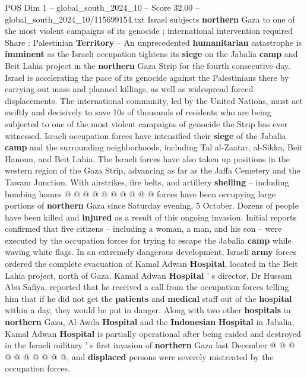 \begin{textsample}{POS Dim 1 – global\_south\_2024\_10 – Score 32.00 – global\_south\_2024\_10/115699154.txt}  \label{ex:f1_pos_165}
Israel subjects \textbf{northern} Gaza to one of the most violent campaigns of its genocide ; international intervention required Share : Palestinian \textbf{Territory} -- An unprecedented \textbf{humanitarian} catastrophe is \textbf{imminent} as the Israeli occupation tightens its \textbf{siege} on the Jabalia \textbf{camp} and Beit Lahia project in the \textbf{northern} Gaza Strip for the fourth consecutive day.
Israel is accelerating the pace of its genocide against the Palestinians there by carrying out mass and planned killings, as well as widespread forced displacements.
The international community, led by the United Nations, must act swiftly and decisively to save 10s of thousands of residents who are being subjected to one of the most violent campaigns of genocide the Strip has ever witnessed.
Israeli occupation forces have intensified their \textbf{siege} of the Jabalia \textbf{camp} and the surrounding neighborhoods, including Tal al-Zaatar, al-Sikka, Beit Hanoun, and Beit Lahia.
The Israeli forces have also taken up positions in the western region of the Gaza Strip, advancing as far as the Jaffa Cemetery and the Tawam Junction.
With airstrikes, fire belts, and artillery \textbf{shelling} -- including bombing homes @ @ @ @ @ @ @ @ @ @ forces have been occupying large portions of \textbf{northern} Gaza since Saturday evening, 5 October.
Dozens of people have been killed and \textbf{injured} as a result of this ongoing invasion.
Initial reports confirmed that five citizens -- including a woman, a man, and his son -- were executed by the occupation forces for trying to escape the Jabalia \textbf{camp} while waving white flags.
In an extremely dangerous development, Israeli \textbf{army} forces ordered the complete evacuation of Kamal Adwan \textbf{Hospital}, located in the Beit Lahia project, north of Gaza.
Kamal Adwan \textbf{Hospital} ' s director, Dr Hussam Abu Safiya, reported that he received a call from the occupation forces telling him that if he did not get the \textbf{patients} and \textbf{medical} staff out of the \textbf{hospital} within a day, they would be put in danger.
Along with two other \textbf{hospitals} in \textbf{northern} Gaza, Al-Awda \textbf{Hospital} and the \textbf{Indonesian} \textbf{Hospital} in Jabalia, Kamal Adwan \textbf{Hospital} is partially operational after being raided and destroyed in the Israeli military ' s first invasion of \textbf{northern} Gaza last December @ @ @ @ @ @ @ @ @ @, and \textbf{displaced} persons were severely mistreated by the occupation forces.

\end{textsample}
